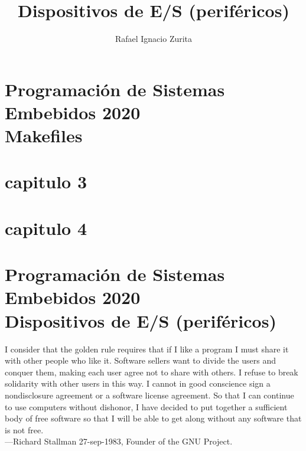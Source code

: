 \documentclass[output=paper, 
colorlinks,
citecolor=brown,
newtxmath
]{langscibook}
\author{Rafael Ignacio Zurita\affiliation{Universidad Nacional del Comahue}}
\title{Dispositivos de E/S (periféricos)}
\begin{document}

\chapterfont{\Large\color{LightBlue}} 
\chapter*{Programación de Sistemas Embebidos 2020\\ Makefiles}
{\def\addcontentsline#1#2#3{}\maketitle}
\chapter*{capitulo 3}
{\def\addcontentsline#1#2#3{}\maketitle}
\chapter*{capitulo 4}
{\def\addcontentsline#1#2#3{}\maketitle}

\chapter*{Programación de Sistemas Embebidos 2020\\ Dispositivos de E/S (periféricos)}

\begingroup
\let\clearpage\relax
\cleardoublepage
\hypersetup{linkcolor=blue}
\tableofcontents
\let\clearpage\relax
\cleardoublepage
\endgroup



{\def\addcontentsline#1#2#3{}\maketitle}


\setcounter{page}{1}


\hfill\begin{minipage}{0.8\linewidth} \footnotesize
I consider that the golden rule requires that if I like a program I 
must share it with other people who like it. 
Software sellers want to divide the users and conquer them, making 
each user agree not to share with others. I refuse to break solidarity 
with other users in this way. I cannot in good conscience sign a
nondisclosure agreement or a software license agreement. 
So that I can continue to use computers
without dishonor, I have decided to put together a sufficient body of free software so that I will be able
to get along without any software that is not free.\\
—Richard Stallman 27-sep-1983, Founder of the GNU Project.
\end{minipage}
\end{document}

